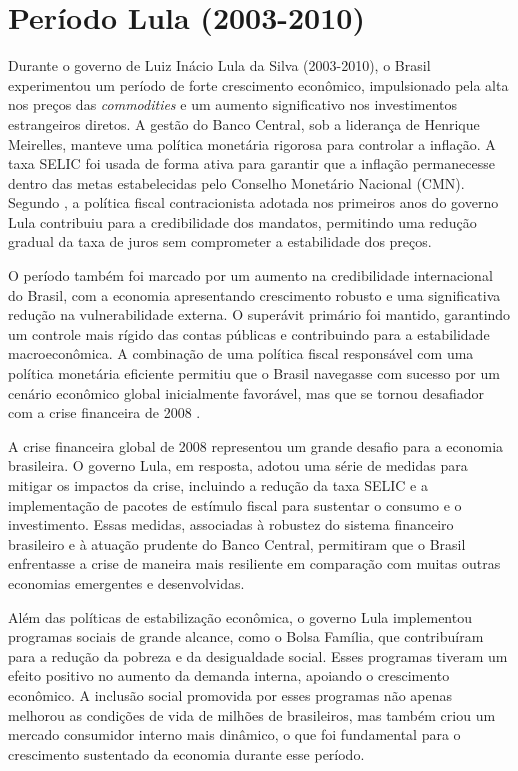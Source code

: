 \documentclass[12pt,oneside,a4paper,chapter=TITLE,english,brazil,sumario=abnt-6027-2012]{abntex2}
\begin{document}
\section{Período Lula (2003-2010)}

Durante o governo de Luiz Inácio Lula da Silva (2003-2010), o Brasil experimentou um período de forte crescimento econômico, impulsionado pela alta nos preços das \textit{commodities} e um aumento significativo nos investimentos estrangeiros diretos. A gestão do Banco Central, sob a liderança de Henrique Meirelles, manteve uma política monetária rigorosa para controlar a inflação. A taxa SELIC foi usada de forma ativa para garantir que a inflação permanecesse dentro das metas estabelecidas pelo Conselho Monetário Nacional (CMN). Segundo , a política fiscal contracionista adotada nos primeiros anos do governo Lula contribuiu para a credibilidade dos mandatos, permitindo uma redução gradual da taxa de juros sem comprometer a estabilidade dos preços.

O período também foi marcado por um aumento na credibilidade internacional do Brasil, com a economia apresentando crescimento robusto e uma significativa redução na vulnerabilidade externa. O superávit primário foi mantido, garantindo um controle mais rígido das contas públicas e contribuindo para a estabilidade macroeconômica. A combinação de uma política fiscal responsável com uma política monetária eficiente permitiu que o Brasil navegasse com sucesso por um cenário econômico global inicialmente favorável, mas que se tornou desafiador com a crise financeira de 2008 \cite{fabiogiambiagi_2016_economia}.

A crise financeira global de 2008 representou um grande desafio para a economia brasileira. O governo Lula, em resposta, adotou uma série de medidas para mitigar os impactos da crise, incluindo a redução da taxa SELIC e a implementação de pacotes de estímulo fiscal para sustentar o consumo e o investimento. Essas medidas, associadas à robustez do sistema financeiro brasileiro e à atuação prudente do Banco Central, permitiram que o Brasil enfrentasse a crise de maneira mais resiliente em comparação com muitas outras economias emergentes e desenvolvidas.

Além das políticas de estabilização econômica, o governo Lula implementou programas sociais de grande alcance, como o Bolsa Família, que contribuíram para a redução da pobreza e da desigualdade social. Esses programas tiveram um efeito positivo no aumento da demanda interna, apoiando o crescimento econômico. A inclusão social promovida por esses programas não apenas melhorou as condições de vida de milhões de brasileiros, mas também criou um mercado consumidor interno mais dinâmico, o que foi fundamental para o crescimento sustentado da economia durante esse período.
\end{document}
